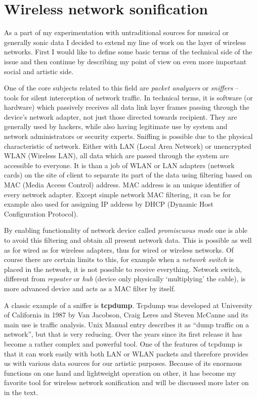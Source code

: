 \documentclass[11pt,a4paper,oneside]{report}
\begin{document}
\section{Wireless network sonification}

As a part of my experimentation with untraditional sources for musical or generally sonic data I decided to extend my line of work on the layer of wireless networks. First I would like to define some basic terms of the technical side of the issue and then continue by describing my point of view on even more important social and artistic side. 


One of the core subjects related to this field are \textit{packet analyzers} or \textit{sniffers} – tools for silent interception of network traffic. In technical terms, it is software (or hardware) which passively receives all data link layer frames passing through the device’s network adapter, not just those directed towards recipient. They are generally used by hackers, while also having legitimate use by system and network administrators or security experts. 
Sniffing is possible due to the physical characteristic of network. Either with LAN (Local Area Network) or unencrypted WLAN (Wireless LAN), all data which are passed through the system are accessible to everyone. It is than a job of WLAN or LAN adapters (network cards) on the site of client to separate its part of the data using filtering based on MAC (Media Access Control) address. MAC address is an unique identifier of every network adapter. Except simple network MAC filtering, it can be for example also used for assigning IP address by DHCP (Dynamic Host Configuration Protocol).

By enabling functionality of network device called \textit{promiscuous mode} one is able to avoid this filtering and obtain all present network data. This is possible as well as for wired as for wireless adapters, thus for wired or wireless networks. Of course there are certain limits to this, for example when a \textit{network switch} is placed in the network, it is not possible to receive everything. Network switch, different from \textit{repeater} or \textit{hub} (device only physically `multiplying' the cable), is more advanced device and acts as a MAC filter by itself. \cite{Pallavi2012}

A classic example of a sniffer is \textbf{tcpdump}. Tcpdump was developed at University of California in 1987 by Van Jacobson, Craig Leres and Steven McCanne and its main use is traffic analysis. Unix Manual entry describes it as ``dump traffic on a network'', but that is very reducing. Over the years since its first release it has become a rather complex and powerful tool. One of the features of tcpdump is that it can work easily with both LAN or WLAN packets and therefore provides us with various data sources for our artistic purposes. Because of its enormous functions on one hand and lightweight operation on other, it has become my favorite tool for wireless network sonification and will be discussed more later on in the text.
\end{document}
